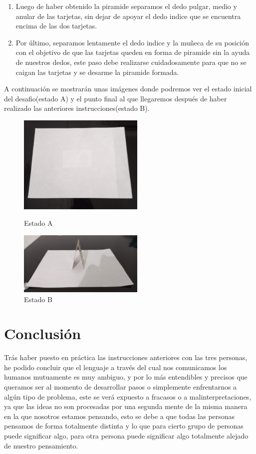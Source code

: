 \documentclass{article}
\begin{document}
\begin{enumerate}
\item Luego de haber obtenido la piramide separamos el dedo pulgar, medio y anular de las tarjetas, sin dejar de apoyar el dedo indice que se encuentra encima de las dos tarjetas.

\item Por último, separamos lentamente el dedo indice y la muñeca de su posición con el objetivo de que las tarjetas queden en forma de piramide sin la ayuda de nuestros dedos, este paso debe realizarse cuidadosamente para que no se caigan las tarjetas y se desarme la piramide formada.  
    
\end{enumerate}

\noindent
A continuación se mostrarán unas imágenes donde podremos ver el estado inicial del desafio(estado A) y el punto final al que llegaremos después de haber realizado las anteriores instrucciones(estado B). 

\begin{figure}[h]
\includegraphics[width=6cm]{Estado A.jpeg}
\centering
\caption{Estado A}
\label{fig:Estado A}

\includegraphics[width=6cm]{Estado B.jpeg}
\caption{Estado B}
\label{fig:Estado B}
\end{figure}


\section{Conclusión} \label{conclulsion}
\noindent
Trás haber puesto en práctica las instrucciones anteriores con las tres personas, he podido concluir que el lenguaje a través del cual nos comunicamos los humanos mutuamente es muy ambiguo, y por lo más entendibles y precisos que queramos ser al momento de desarrollar pasos o simplemente enfrentarnos a algún tipo de problema, este se verá expuesto a fracasos o a malinterpretaciones, ya que las ideas no son procesadas por una segunda mente de la misma manera en la que nosotros estamos pensando, esto se debe a que todas las personas pensamos de forma totalmente distinta y lo que para cierto grupo de personas puede significar algo, para otra persona puede significar algo totalmente alejado de nuestro pensamiento.
\end{document}
